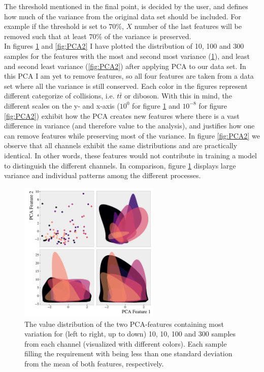 The threshold mentioned in the final point, is decided by the user, and defines how much of the variance from the original data 
set should be included. For example if the threshold is set to $70\%$, $X$ number of the last features will be removed such 
that at least $70\%$ of the variance is preserved.
\\
In figures \ref{fig:PCA1} and \ref{fig:PCA2} I have plotted the distribution of 10, 100 and 300 samples 
for the features with the most and second most variance (\ref{fig:PCA1}), and least and second least 
variance (\ref{fig:PCA2}) after applying \ac{PCA} to our data set. In this \ac{PCA} I am yet to remove features, 
so all four features are taken from a data set where all the variance is still conserved. Each color in the figures 
represent different categorize of collisions, i.e. $t\bar{t}$ or diboson. With this in 
mind, the different scales on the y- and x-axis ($10^0$ for figure \ref{fig:PCA1} and $10^{-8}$ for figure 
\ref{fig:PCA2}) exhibit how the \ac{PCA} creates new features where there is a vast difference in variance 
(and therefore value to the analysis), and justifies how one can remove features while preserving most of the variance. 
In figure \ref{fig:PCA2} we observe that all channels exhibit the same distributions and are practically identical. 
In other words, these features would not contribute in training a model to distinguish the different channels. 
In comparison, figure \ref{fig:PCA1} displays large variance and individual patterns among the different processes.
\begin{figure}
    \centering
    \includegraphics[width=0.6\textwidth]{Figures/MLResults/DataHandling/PCA/PCAPlotFirst.pdf}
    \caption[The value distribution of the two leading \acs{PCA}-features.]{The value distribution of 
    the two \ac{PCA}-features containing most variation for (left to right, up to down) 10, 10, 100 and 
    300 samples from each channel (visualized with different colors). Each sample filling the requirement with being less than one standard 
    deviation from the mean of both features, respectively.}
    \label{fig:PCA1}
\end{figure}
